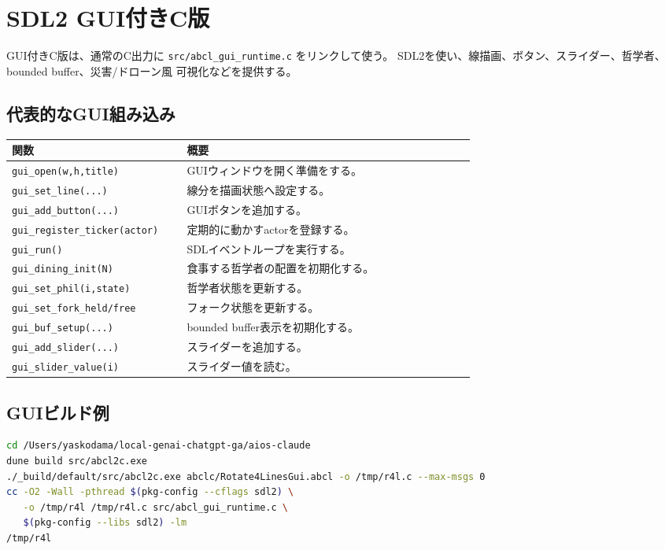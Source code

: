 \documentclass[11pt,a4paper,uplatex,dvipdfmx]{jsarticle}
\begin{document}
\section{SDL2 GUI付きC版}

GUI付きC版は、通常のC出力に \texttt{src/abcl\_gui\_runtime.c} をリンクして使う。
SDL2を使い、線描画、ボタン、スライダー、哲学者、bounded buffer、災害/ドローン風
可視化などを提供する。

\subsection{代表的なGUI組み込み}

\begin{longtable}{p{0.34\linewidth}p{0.56\linewidth}}
\toprule
関数 & 概要 \\
\midrule
\texttt{gui\_open(w,h,title)} & GUIウィンドウを開く準備をする。 \\
\texttt{gui\_set\_line(...)} & 線分を描画状態へ設定する。 \\
\texttt{gui\_add\_button(...)} & GUIボタンを追加する。 \\
\texttt{gui\_register\_ticker(actor)} & 定期的に動かすactorを登録する。 \\
\texttt{gui\_run()} & SDLイベントループを実行する。 \\
\texttt{gui\_dining\_init(N)} & 食事する哲学者の配置を初期化する。 \\
\texttt{gui\_set\_phil(i,state)} & 哲学者状態を更新する。 \\
\texttt{gui\_set\_fork\_held/free} & フォーク状態を更新する。 \\
\texttt{gui\_buf\_setup(...)} & bounded buffer表示を初期化する。 \\
\texttt{gui\_add\_slider(...)} & スライダーを追加する。 \\
\texttt{gui\_slider\_value(i)} & スライダー値を読む。 \\
\bottomrule
\end{longtable}

\subsection{GUIビルド例}

\begin{lstlisting}[style=aipl,language=bash]
cd /Users/yaskodama/local-genai-chatgpt-ga/aios-claude
dune build src/abcl2c.exe
./_build/default/src/abcl2c.exe abclc/Rotate4LinesGui.abcl -o /tmp/r4l.c --max-msgs 0
cc -O2 -Wall -pthread $(pkg-config --cflags sdl2) \
   -o /tmp/r4l /tmp/r4l.c src/abcl_gui_runtime.c \
   $(pkg-config --libs sdl2) -lm
/tmp/r4l
\end{lstlisting}
\end{document}
